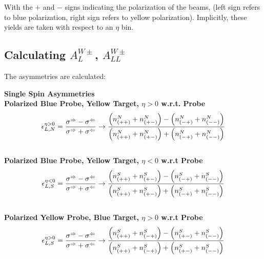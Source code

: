 With the $+$ and $-$ signs indicating the polarization of the beams, (left sign
refers to blue polarization, right sign refers to yellow polarization).
Implicitly, these yields are taken with respect to an $\eta$ bin.

\subsection{Calculating $A_L^{W\pm}$, $A_{LL}^{W\pm}$}
\label{sec:calculating_al}

The asymmetries are calculated:

\noindent\textbf{Single Spin Asymmetries}\\

\noindent\textbf{Polarized Blue Probe, Yellow Target, $\eta > 0$ w.r.t. Probe}
\begin{equation}
  {\epsilon_{L,N}^{\eta > 0}} 
  = 
  { 
    {\sigma^\Rightarrow-\sigma^\Leftarrow} 
    \over 
    {\sigma^\Rightarrow+\sigma^\Leftarrow} 
  } 
  \to 
  {
    {\left(n_{(++)}^N+n_{(+-)}^N\right)-\left(n_{(-+)}^N+n_{(--)}^N\right)}
    \over
    {\left(n_{(++)}^N+n_{(+-)}^N\right)+\left(n_{(-+)}^N+n_{(--)}^N\right)}
  }
  \label{eq:al_blue_probe_pos_rap}
\end{equation}\\

\noindent\textbf{Polarized Blue Probe, Yellow Target, $\eta < 0$ w.r.t Probe}
\begin{equation}
  {\epsilon_{L,S}^{\eta < 0}} 
  = 
  { 
    {\sigma^\Rightarrow - \sigma^\Leftarrow} 
    \over 
    {\sigma^\Rightarrow + \sigma^\Leftarrow} 
  } 
  \to 
  {
    {\left(n_{(++)}^S+n_{(+-)}^S\right)-\left(n_{(-+)}^S+n_{(--)}^S\right)}
    \over
    {\left(n_{(++)}^S+n_{(+-)}^S\right)+\left(n_{(-+)}^S+n_{(--)}^S\right)}
  }
  \label{eq:al_blue_probe_neg_rap}
\end{equation}\\

\noindent\textbf{Polarized Yellow Probe, Blue Target, $\eta > 0$ w.r.t Probe}
\begin{equation}
  {\epsilon_{L,S}^{\eta > 0}} 
  = 
  { 
    {\sigma^\Rightarrow-\sigma^\Leftarrow} 
    \over 
    {\sigma^\Rightarrow+\sigma^\Leftarrow} 
  } 
  \to 
  {
    {\left(n_{(++)}^S+n_{(-+)}^S\right)-\left(n_{(+-)}^S+n_{(--)}^S\right)}
    \over
    {\left(n_{(++)}^S+n_{(-+)}^S\right)+\left(n_{(+-)}^S+n_{(--)}^S\right)}
  }
  \label{eq:al_yell_probe_pos_rap}
\end{equation}\\

